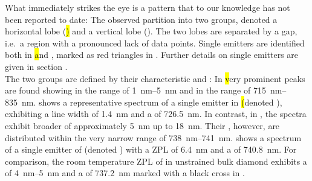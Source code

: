 	What immediately strikes the eye is a pattern that to our knowledge has not been reported to date:
	The observed \ZPLs partition into two groups, denoted a horizontal lobe (\hl) and a vertical lobe (\vl). The two lobes are separated by a gap, i.e.\ a region with a pronounced lack of data points.
	Single emitters are identified both in \hl and \vl, marked as red triangles in . Further details on single emitters are given in section .
	\\
	The two groups are defined by their characteristic \cwls and \lws:
	In \hl very prominent \ZPL peaks are found showing \lws in the range of \SIrange{1}{5}{nm} and \cwls in the range of \SIrange{715}{835}{nm}.
	 shows a representative spectrum of a single emitter in \hl (denoted \emnarrow), exhibiting a \ZPL line width of \SI{1.4}{nm} and a \cwl of \SI{726.5}{nm}.
	In contrast, in \vl, the spectra exhibit broader \ZPL \lws of approximately \SI{5}{nm} up to \SI{18}{nm}.
	Their \ZPL \cwls, however, are distributed within the very narrow range of \SIrange{738}{741}{nm}.
	 shows a spectrum of a single emitter of \vl (denoted \embroad) with a ZPL \lw of \SI{6.4}{nm} and a \cwl of \SI{740.8}{nm}.
	For comparison, the room temperature ZPL of \sivs in unstrained bulk diamond exhibits a \lw of \SIrange{4}{5}{nm} and a \cwl of \SI{737.2}{nm} marked with a black cross in  \cite{Arend2016a,Dietrich2014}.

